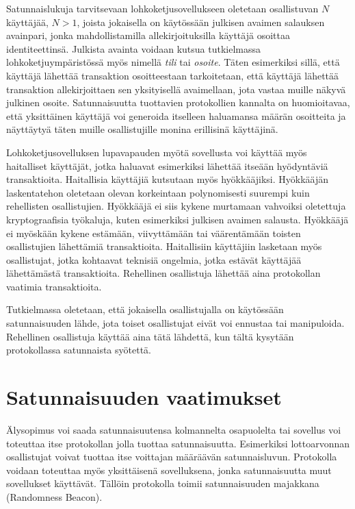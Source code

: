 Satunnaislukuja tarvitsevaan lohkoketjusovellukseen oletetaan osallistuvan $N$ käyttäjää, $N > 1$, joista jokaisella on käytössään julkisen avaimen salauksen avainpari, jonka mahdollistamilla allekirjoituksilla käyttäjä osoittaa identiteettinsä. Julkista avainta voidaan kutsua tutkielmassa lohkoketjuympäristössä myös nimellä \textit{tili} tai \textit{osoite}. Täten esimerkiksi sillä, että käyttäjä lähettää transaktion osoitteestaan tarkoitetaan, että käyttäjä lähettää transaktion allekirjoittaen sen yksityisellä avaimellaan, jota vastaa muille näkyvä julkinen osoite.  Satunnaisuutta tuottavien protokollien kannalta on huomioitavaa, että yksittäinen käyttäjä voi generoida itselleen haluamansa määrän osoitteita ja näyttäytyä täten muille osallistujille monina erillisinä käyttäjinä.

Lohkoketjusovelluksen lupavapauden myötä sovellusta voi käyttää myös haitalliset käyttäjät, jotka haluavat esimerkiksi lähettää itseään hyödyntäviä transaktioita. Haitallisia käyttäjiä kutsutaan myös hyökkääjiksi. Hyökkääjän laskentatehon oletetaan olevan korkeintaan polynomisesti suurempi kuin rehellisten osallistujien. Hyökkääjä ei siis kykene murtamaan vahvoiksi oletettuja kryptograafisia työkaluja, kuten esimerkiksi julkisen avaimen salausta. Hyökkääjä ei myöskään kykene estämään, viivyttämään tai väärentämään toisten osallistujien lähettämiä transaktioita. Haitallisiin käyttäjiin lasketaan myös osallistujat, jotka kohtaavat teknisiä ongelmia, jotka estävät käyttäjää lähettämästä transaktioita. Rehellinen osallistuja lähettää aina protokollan vaatimia transaktioita.

Tutkielmassa oletetaan, että jokaisella osallistujalla on käytössään satunnaisuuden lähde, jota toiset osallistujat eivät voi ennustaa tai manipuloida. Rehellinen osallistuja käyttää aina tätä lähdettä, kun tältä kysytään protokollassa satunnaista syötettä.

\section{Satunnaisuuden vaatimukset}

Älysopimus voi saada satunnaisuutensa kolmannelta osapuolelta tai sovellus voi toteuttaa itse protokollan jolla tuottaa satunnaisuutta. Esimerkiksi lottoarvonnan osallistujat voivat tuottaa itse voittajan määräävän satunnaisluvun. Protokolla voidaan toteuttaa myös yksittäisenä sovelluksena, jonka satunnaisuutta muut sovellukset käyttävät. Tällöin protokolla toimii satunnaisuuden majakkana (Randomness Beacon).

